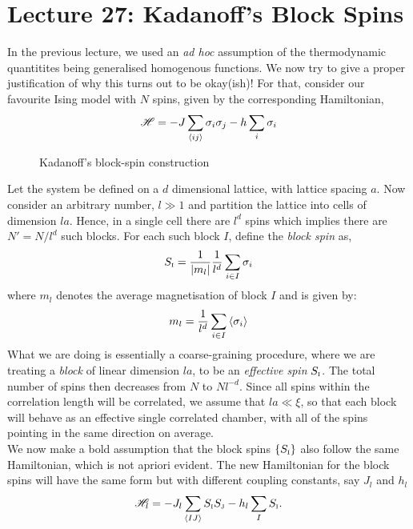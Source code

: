 \section*{Lecture 27: Kadanoff's Block Spins}
In the previous lecture, we used an \textit{ad hoc} assumption of the thermodynamic quantitites being generalised homogenous functions. We now try to give a proper justification of why this turns out to be okay(ish)! For that, consider our favourite Ising model with $N$ spins, given by the corresponding Hamiltonian,
\begin{align*}
    \mathscr{H} = -J \sum\limits_{\left\langle ij \right\rangle} \sigma_i \sigma_j - h \sum\limits_{i}\sigma_i
\end{align*}
\begin{figure}[H]
    \centering
    
    \caption{Kadanoff's block-spin construction}
\end{figure}
\noindent 
Let the system be defined on a $d$ dimensional lattice, with lattice spacing $a$. Now consider an arbitrary number, $l\gg 1$ and partition the lattice into cells of dimension $la$. Hence, in a single cell there are $l^d$ spins which implies there are $N'=N/l^d$ such blocks. For each such block $I$, define the \textit{block spin} as,
\begin{equation}
    S_{\text{\tiny I}} = \frac{1}{\abs{m_l}} \frac{1}{l^d}\sum\limits_{i\in I} \sigma_i
\end{equation}
where $m_l$ denotes the average magnetisation of block $I$ and is given by:
\begin{equation}\label{blockmag}
    m_l = \frac{1}{l^d}\sum\limits_{i\in I} \left\langle \sigma_i \right\rangle
\end{equation}
What we are doing is essentially a coarse-graining procedure, where we are treating a \textit{block} of linear dimension $la$, to be an \textit{effective spin} $S_{\text{\tiny I}}$. The total number of spins then decreases from $N$ to $Nl^{-d}$. Since all spins within the correlation length will be correlated, we assume that $la \ll \xi$, so that each block will behave as an effective single correlated chamber, with all of the spins pointing in the same direction on average. \\[0.2cm]
We now make a bold assumption that the block spins $\{S_{\text{\tiny I}}\}$ also follow the same Hamiltonian, which is not apriori evident. The new Hamiltonian for the block spins will have the same form but with different coupling constants, say $J_l$ and $h_l$ 
\begin{equation}
    \mathscr{H}_l = -J_l\sum\limits_{\left\langle IJ \right\rangle}S_{\text{\tiny I}}S_{\text{\tiny J}} -h_l \sum\limits_{I}S_{\text{\tiny I}}. 
\end{equation}
